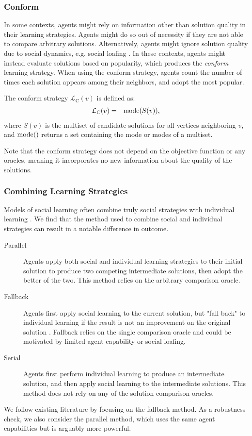\subsubsection{Conform}
In some contexts, agents might rely on information other than solution quality in their learning strategies.
Agents might do so out of necessity if they are not able to compare arbitrary solutions.
Alternatively, agents might ignore solution quality due to social dynamics, e.g. social loafing \cite{karau_social_1993}. In these contexts, agents might instead evaluate solutions based on popularity, which produces the {\em conform} learning strategy.
When using the conform strategy, agents count the number of times each solution appears among their neighbors, and adopt the most popular.
\begin{definition}
The conform strategy $\mathcal{L}_{\text{C}}(v)$ is defined as:
\begin{eqnarray}
\mathcal{L}_{\text{C}}(v) &=&
\operatorname{mode}(S(v)),
\end{eqnarray}
where $S(v)$ is the multiset of candidate solutions for all vertices neighboring $v$, and $\operatorname{mode}()$ returns a set containing the mode or modes of a multiset.
\end{definition}
Note that the conform strategy does not depend on the objective function or any oracles, meaning it incorporates no new information about the quality of the solutions.

\subsubsection{Combining Learning Strategies}\label{subsubsec:combine}
Models of social learning often combine truly social strategies with individual learning \cite{lazer_network_2007,barkoczi_social_2016,gomez_clustering_2019}.
We find that the method used to combine social and individual strategies can result in a notable difference in outcome.
\begin{description}
\item[Parallel]{
Agents apply both social and individual learning strategies to their initial solution to produce two competing intermediate solutions, then adopt the better of the two. This method relies on the arbitrary comparison oracle.}
\item[Fallback]{
Agents first apply social learning to the current solution, but "fall back" to individual learning if the result is not an improvement on the original solution \cite{lazer_network_2007, barkoczi_social_2016,gomez_clustering_2019}. Fallback relies on the single comparison oracle and could be motivated by limited agent capability or social loafing.}
\item[Serial]{
Agents first perform individual learning to produce an intermediate solution, and then apply social learning to the intermediate solutions. This method does not rely on any of the solution comparison oracles.}
\end{description}
We follow existing literature by focusing on the fallback method.
As a robustness check, we also consider the parallel method,
which uses the same agent capabilities but is arguably more powerful.

